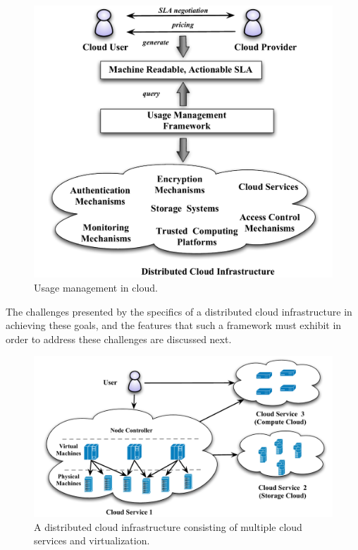 \documentclass[notitlepage]{book}
\begin{document}
\begin{doublespace}
\begin{figure}[!t]
\centering
\includegraphics[scale=0.5]{cloud-umf}
\caption{Usage management in cloud.}
\label{fig:cloud-umf}
\end{figure}

The challenges presented by the specifics of a distributed cloud infrastructure in achieving these goals, and the features that such a framework must exhibit in order to address these challenges are discussed next. 

\begin{figure}[t]
\centering
\includegraphics[width=14cm]{cloud-infra}
\caption{A distributed cloud infrastructure consisting of multiple cloud services and virtualization.}
\label{fig:cloud-infra}
\end{figure}


\end{doublespace}
\end{document}
